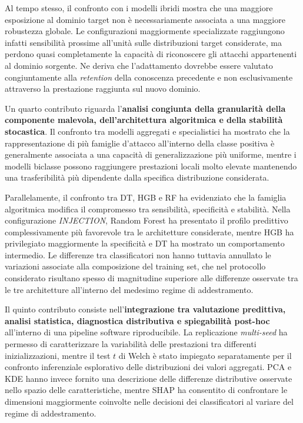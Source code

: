 Al tempo stesso, il confronto con i modelli ibridi mostra che una maggiore esposizione al dominio target non è necessariamente associata a una maggiore robustezza globale.
Le configurazioni maggiormente specializzate raggiungono infatti sensibilità prossime all'unità sulle distribuzioni target considerate, ma perdono quasi completamente la capacità di riconoscere gli attacchi appartenenti al dominio sorgente.
Ne deriva che l'adattamento dovrebbe essere valutato congiuntamente alla \textit{retention} della conoscenza precedente e non esclusivamente attraverso la prestazione raggiunta sul nuovo dominio.

Un quarto contributo riguarda l'\textbf{analisi congiunta della granularità della componente malevola, dell'architettura algoritmica e della stabilità stocastica}.
Il confronto tra modelli aggregati e specialistici ha mostrato che la rappresentazione di più famiglie d'attacco all'interno della classe positiva è generalmente associata a una capacità di generalizzazione più uniforme, mentre i modelli biclasse possono raggiungere prestazioni locali molto elevate mantenendo una trasferibilità più dipendente dalla specifica distribuzione considerata.

Parallelamente, il confronto tra DT, HGB e RF ha evidenziato che la famiglia algoritmica modifica il compromesso tra sensibilità, specificità e stabilità.
Nella configurazione \textit{INJECTION}, Random Forest ha presentato il profilo predittivo complessivamente più favorevole tra le architetture considerate, mentre HGB ha privilegiato maggiormente la specificità e DT ha mostrato un comportamento intermedio.
Le differenze tra classificatori non hanno tuttavia annullato le variazioni associate alla composizione del training set, che nel protocollo considerato risultano spesso di magnitudine superiore alle differenze osservate tra le tre architetture all'interno del medesimo regime di addestramento.

Il quinto contributo consiste nell'\textbf{integrazione tra valutazione predittiva, analisi statistica, diagnostica distributiva e spiegabilità post-hoc} all'interno di una pipeline software riproducibile.
La replicazione \textit{multi-seed} ha permesso di caratterizzare la variabilità delle prestazioni tra differenti inizializzazioni, mentre il test $t$ di Welch è stato impiegato separatamente per il confronto inferenziale esplorativo delle distribuzioni dei valori aggregati.
PCA e KDE hanno invece fornito una descrizione delle differenze distributive osservate nello spazio delle caratteristiche, mentre SHAP ha consentito di confrontare le dimensioni maggiormente coinvolte nelle decisioni dei classificatori al variare del regime di addestramento.

